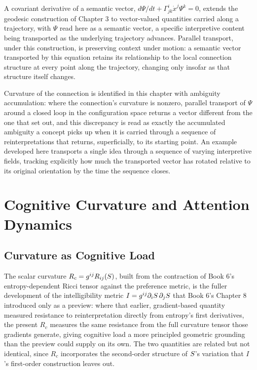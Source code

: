 A covariant derivative of a semantic vector, $d\Psi/dt + \Gamma^i_{jk} \dot{x}^j \Psi^k = 0$, extends the geodesic construction of Chapter 3 to vector-valued quantities carried along a trajectory, with $\Psi$ read here as a semantic vector, a specific interpretive content being transported as the underlying trajectory advances. Parallel transport, under this construction, is preserving context under motion: a semantic vector transported by this equation retains its relationship to the local connection structure at every point along the trajectory, changing only insofar as that structure itself changes.

Curvature of the connection is identified in this chapter with ambiguity accumulation: where the connection's curvature is nonzero, parallel transport of $\Psi$ around a closed loop in the configuration space returns a vector different from the one that set out, and this discrepancy is read as exactly the accumulated ambiguity a concept picks up when it is carried through a sequence of reinterpretations that returns, superficially, to its starting point. An example developed here transports a single idea through a sequence of varying interpretive fields, tracking explicitly how much the transported vector has rotated relative to its original orientation by the time the sequence closes.

\part{Cognitive Curvature and Attention Dynamics}

\chapter{Curvature as Cognitive Load}

The scalar curvature $R_c = g^{ij} R_{ij}(S)$, built from the contraction of Book 6's entropy-dependent Ricci tensor against the preference metric, is the fuller development of the intelligibility metric $I = g^{ij}\partial_i S\, \partial_j S$ that Book 6's Chapter 8 introduced only as a preview: where that earlier, gradient-based quantity measured resistance to reinterpretation directly from entropy's first derivatives, the present $R_c$ measures the same resistance from the full curvature tensor those gradients generate, giving cognitive load a more principled geometric grounding than the preview could supply on its own. The two quantities are related but not identical, since $R_c$ incorporates the second-order structure of $S$'s variation that $I$'s first-order construction leaves out.

